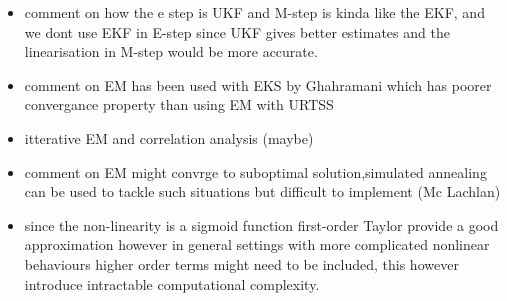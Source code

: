 \documentclass[]{article}
\begin{document}
\begin{itemize}
	\item comment on how the e step is UKF and M-step is kinda like the EKF, and we dont use EKF in E-step since UKF gives better estimates and the linearisation in M-step would be more accurate. 
	\item comment on EM has been used with EKS by Ghahramani which has poorer convergance property than using EM with URTSS
	\item itterative EM and correlation analysis (maybe)
	\item{comment on EM might convrge to suboptimal solution,simulated
annealing can be used to tackle such situations but difficult to implement (Mc Lachlan)}
	\item{since the non-linearity is a sigmoid function first-order Taylor provide a good approximation however in general settings with more complicated nonlinear behaviours higher order terms might need to be included, this however introduce intractable computational complexity.}
\end{itemize}

\end{document}

